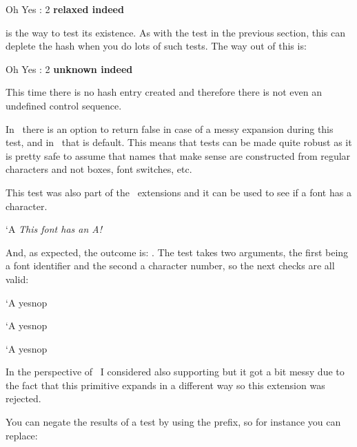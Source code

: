 \starttyping[option=TEX]
\expandafter\ifx\csname Oh Yes : 2\endcsname\relax
    {\bf relaxed indeed}
\fi
\stoptyping

is the way to test its existence. As with the test in the previous section,
this can deplete the hash when you do lots of such tests. The way out of this
is:

\starttyping[option=TEX]
\ifcsname Oh Yes : 2\endcsname \else
    {\bf unknown indeed}
\fi
\stoptyping

This time there is no hash entry created and therefore there is not even an
undefined control sequence.

In \LUATEX\ there is an option to return false in case of a messy expansion
during this test, and in \LUAMETATEX\ that is default. This means that tests can
be made quite robust as it is pretty safe to assume that names that make sense
are constructed from regular characters and not boxes, font switches, etc.

\stopsectionlevel

\startsectionlevel[title={\tex{iffontchar}}]

This test was also part of the \ETEX\ extensions and it can be used to see if
a font has a character.

\startbuffer
\iffontchar\font`A
    {\em This font has an A!}
\fi
\stopbuffer

\typebuffer[option=TEX]

And, as expected, the outcome is: \quotation {\inlinebuffer}. The test takes two
arguments, the first being a font identifier and the second a character number,
so the next checks are all valid:

\starttyping[option=TEX]
\iffontchar\font     `A yes\else nop\fi\par
\iffontchar\nullfont `A yes\else nop\fi\par
\iffontchar{}`A yes\else nop\fi\par
\stoptyping

In the perspective of \LUAMETATEX\ I considered also supporting \type {\fontid}
but it got a bit messy due to the fact that this primitive expands in a different
way so this extension was rejected.

\stopsectionlevel

\startsectionlevel[title={\tex{unless}}]

You can negate the results of a test by using the \type {\unless} prefix, so for
instance you can replace:

\starttyping[option=TEX]
\ifdim\scratchdimen=10pt
    \dosomething
\else\ifdim\scratchdimen<10pt
    \dosomething
\fi\fi
\stoptyping

